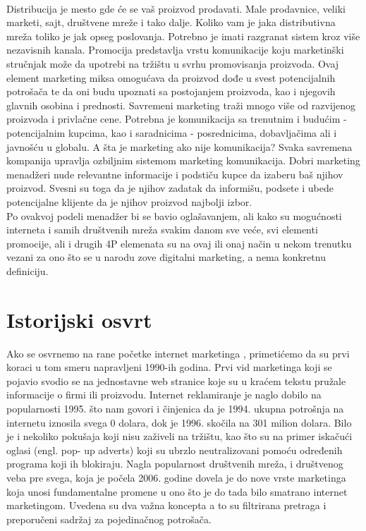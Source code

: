 \documentclass[a4paper]{article}
\begin{document}
{\\ Distribucija je mesto gde će se vaš proizvod prodavati. Male prodavnice, veliki marketi, sajt, društvene mreže i tako dalje. Koliko vam je jaka distributivna mreža toliko je jak opseg poslovanja. Potrebno je imati razgranat sistem kroz više nezavisnih kanala. Promocija predstavlja vrstu komunikacije koju marketinški stručnjak može da upotrebi na tržištu u svrhu promovisanja proizvoda. Ovaj element marketing miksa omogućava da proizvod dođe u svest potencijalnih potrošača te da oni budu upoznati sa postojanjem proizvoda, kao i njegovih glavnih osobina i prednosti. Savremeni marketing traži mnogo više od razvijenog proizvoda i privlačne cene. Potrebna je komunikacija sa trenutnim i budućim - potencijalnim kupcima, kao i saradnicima - posrednicima, dobavljačima ali i javnošću u globalu. A šta je marketing ako nije komunikacija? Svaka savremena kompanija upravlja ozbiljnim sistemom marketing komunikacija. Dobri marketing menadžeri nude relevantne informacije i podstiču kupce da izaberu baš njihov proizvod. Svesni su toga da je njihov zadatak da informišu, podsete i ubede potencijalne klijente da je njihov proizvod najbolji izbor.
\\ Po ovakvoj podeli menadžer bi se bavio oglašavanjem, ali kako su mogućnosti interneta i samih društvenih mreža svakim danom sve veće, svi elementi promocije, ali i drugih 4P elemenata su na ovaj ili onaj način u nekom trenutku vezani za ono što se u narodu zove digitalni marketing, a nema konkretnu definiciju. 
\cite{uvod}
\newpage

\section{Istorijski osvrt}
\label{sec: Istorijski osvrt}
Ako se osvrnemo na rane početke internet marketinga , primetićemo da su prvi koraci u tom smeru napravljeni 1990-ih godina. Prvi vid marketinga koji se pojavio svodio se na jednostavne web stranice koje su u kraćem tekstu pružale informacije o firmi ili proizvodu. Internet reklamiranje je naglo dobilo na popularnosti 1995. što nam govori i činjenica da je 1994. ukupna potrošnja na internetu iznosila svega 0 dolara, dok je 1996. skočila na 301 milion dolara.
Bilo je i nekoliko pokušaja koji nisu zaživeli na tržištu, kao što su na primer iskačući oglasi (engl. pop- up adverts) koji su ubrzlo neutralizovani pomoću određenih programa koji ih blokiraju.
Nagla popularnost društvenih mreža, i društvenog veba pre svega, koja je počela 2006. godine dovela je do nove vrste marketinga koja unosi fundamentalne promene u ono što je do tada bilo smatrano internet marketingom. Uvedena su dva važna koncepta a to su filtrirana pretraga i preporučeni sadržaj za pojedinačnog potrošača.
}
\end{document}
